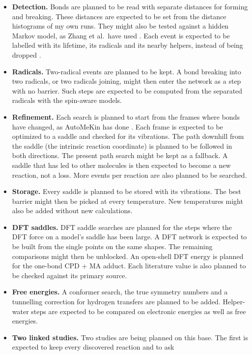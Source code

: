 \documentclass[11pt]{article}
\begin{document}
\begin{itemize}
\item \textbf{Detection.} Bonds are planned to be read with separate
distances for forming and breaking. These distances are expected to be set
from the distance histograms of my own runs. They might also be tested
against a hidden Markov model, as Zhang et al.\ have used
\cite{zhang2023,reacnet}. Each event is expected to be labelled with its
lifetime, its radicals and its nearby helpers, instead of being dropped
\cite{chemtrayzer}.
\item \textbf{Radicals.} Two-radical events are planned to be kept. A bond
breaking into two radicals, or two radicals joining, might then enter the
network as a step with no barrier. Such steps are expected to be computed
from the separated radicals with the spin-aware models.
\item \textbf{Refinement.} Each search is planned to start from the frames
where bonds have changed, as AutoMeKin has done \cite{automekin}. Each
frame is expected to be optimized to a saddle and checked for its
vibrations. The path downhill from the saddle (the intrinsic reaction
coordinate) is planned to be followed in both directions. The present path
search might be kept as a fallback. A saddle that has led to other
molecules is then expected to become a new reaction, not a loss. More
events per reaction are also planned to be searched.
\item \textbf{Storage.} Every saddle is planned to be stored with its
vibrations. The best barrier might then be picked at every temperature.
New temperatures might also be added without new calculations.
\item \textbf{DFT saddles.} DFT saddle searches are planned for the steps
where the DFT force on a model's saddle has been large. A DFT network is
expected to be built from the single points on the same shapes. The
remaining comparisons might then be unblocked. An open-shell DFT energy is
planned for the one-bond CPD + MA adduct. Each literature value is also
planned to be checked against its primary source.
\item \textbf{Free energies.} A conformer search, the true symmetry numbers
and a tunnelling correction for hydrogen transfers are planned to be
added. Helper-water steps are expected to be compared on electronic
energies as well as free energies.
\item \textbf{Two linked studies.} Two studies are being planned on this
base. The first is expected to keep every discovered reaction and to ask

\end{itemize}
\end{document}
